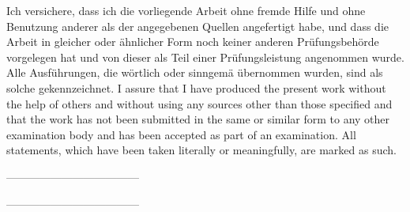 \vspace*{1cm}

\large
\noindent
{}
{Ich versichere, dass ich die vorliegende Arbeit ohne fremde Hilfe und ohne Benutzung anderer als der angegebenen Quellen angefertigt \nobreak habe, und dass die Arbeit in gleicher oder \"ahnlicher Form noch keiner anderen Pr\"ufungsbeh\"orde vorgelegen hat und von dieser als Teil einer Pr\"ufungsleistung angenommen wurde. Alle Ausf\"uhrungen, die w\"ortlich oder sinngem\"a\s{} übernommen wurden, sind als solche gekennzeichnet.}
{I assure that I have produced the present work without the help of others and without using any sources other than those specified and that the work has not been submitted in the same or similar form to any other examination body and has been accepted as part of an examination. All statements, which have been taken literally or meaningfully, are marked as such.}
\vspace{3cm}

\begin{minipage}{0.45\textwidth}
	------------------------------------
	
	
\end{minipage}
\begin{minipage}{0.45\textwidth}
	------------------------------------
	

	
\end{minipage}

\normalsize